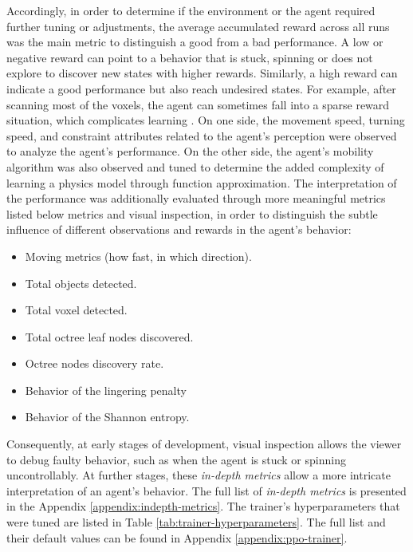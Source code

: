 Accordingly, in order to determine if the environment or the agent required further tuning or adjustments, the average accumulated reward across all runs was the main metric to distinguish a good from a bad performance. A low or negative reward can point to a behavior that is stuck, spinning or does not explore to discover new states with higher rewards. Similarly, a high reward can indicate a good performance but also reach undesired states. For example, after scanning most of the voxels, the agent can sometimes fall into a sparse reward situation, which complicates learning \cite{sutton2018reinforcement}.
On one side, the movement speed, turning speed, and constraint attributes related to the agent's perception were observed to analyze the agent's performance. On the other side, the agent's mobility algorithm was also observed and tuned to determine the added complexity of learning a physics model through function approximation.
The interpretation of the performance was additionally evaluated through more meaningful metrics listed below metrics and visual inspection, in order to distinguish the subtle influence of different observations and rewards in the agent's behavior:
\begin{multicols}{2}
    \begin{itemize}
        \item Moving metrics (how fast, in which direction).
        \item Total objects detected.
        \item Total voxel detected.
        \item Total octree leaf nodes discovered.
        \item Octree nodes discovery rate.
        \item Behavior of the lingering penalty
        \item Behavior of the Shannon entropy.
    \end{itemize}
\end{multicols}
Consequently, at early stages of development, visual inspection allows the viewer to debug faulty behavior, such as when the agent is stuck or spinning uncontrollably. At further stages, these \textit{in-depth metrics} allow a more intricate interpretation of an agent's behavior.
The full list of \textit{in-depth metrics} is presented in the Appendix \ref{appendix:indepth-metrics}.
The trainer's hyperparameters that were tuned are listed in Table \ref{tab:trainer-hyperparameters}. The full list and their default values can be found in Appendix \ref{appendix:ppo-trainer}. 


